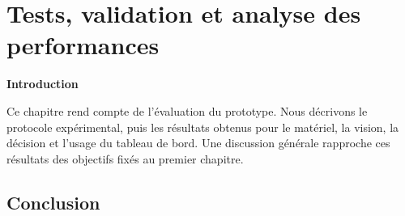 \chapter{\textcolor{mycolor}{\textbf{Tests, validation et analyse des performances}}}
\fancyhf{}
\fancyhead[L]{\small\itshape\nouppercase{\rightmark}}
\fancyfoot[L]{\small\itshape\nouppercase{\leftmark}}
\fancyfoot[R]{\small\itshape\thepage}
\renewcommand{\headrulewidth}{1pt}
\renewcommand{\footrulewidth}{0.4pt}

\vfill
\begin{flushright}{\Large\bfseries\textcolor{mycolor}{Introduction}}\end{flushright}

Ce chapitre rend compte de l'évaluation du prototype. Nous décrivons le protocole expérimental, puis les résultats obtenus pour le matériel, la vision, la décision et l'usage du tableau de bord. Une discussion générale rapproche ces résultats des objectifs fixés au premier chapitre.

\clearpage














\section*{Conclusion}

